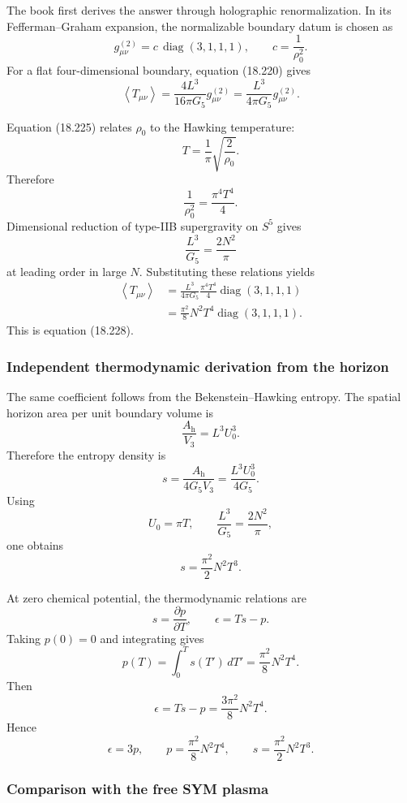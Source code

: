 \documentclass[
  10pt,
  a4paper,
  openany]{book}
\begin{document}
The book first derives the answer through holographic renormalization.
In its Fefferman--Graham expansion, the normalizable boundary datum is
chosen as \[
g^{(2)}_{\mu\nu}
=c\,
\operatorname{diag}(3,1,1,1),
\qquad
c=\frac1{\rho_0^2}.
\] For a flat four-dimensional boundary, equation (18.220) gives \[
\left\langle T_{\mu\nu}\right\rangle
=
\frac{4L^3}{16\pi G_5}
g^{(2)}_{\mu\nu}
=
\frac{L^3}{4\pi G_5}
g^{(2)}_{\mu\nu}.
\]

Equation (18.225) relates \(\rho_0\) to the Hawking temperature: \[
T
=\frac1\pi\sqrt{\frac2{\rho_0}}.
\] Therefore \[
\frac1{\rho_0^2}
=\frac{\pi^4T^4}{4}.
\] Dimensional reduction of type-IIB supergravity on \(S^5\) gives \[
\boxed{
\frac{L^3}{G_5}
=\frac{2N^2}{\pi}
}
\] at leading order in large \(N\). Substituting these relations yields
\[
\begin{aligned}
\left\langle T_{\mu\nu}\right\rangle
&=
\frac{L^3}{4\pi G_5}
\frac{\pi^4T^4}{4}
\operatorname{diag}(3,1,1,1)\\
&=
\frac{\pi^2}{8}N^2T^4
\operatorname{diag}(3,1,1,1).
\end{aligned}
\] This is equation (18.228).

\subsubsection{Independent thermodynamic derivation from the
horizon}\label{independent-thermodynamic-derivation-from-the-horizon}

The same coefficient follows from the Bekenstein--Hawking entropy. The
spatial horizon area per unit boundary volume is \[
\frac{A_{\mathrm h}}{V_3}
=L^3U_0^3.
\] Therefore the entropy density is \[
s
=\frac{A_{\mathrm h}}{4G_5V_3}
=\frac{L^3U_0^3}{4G_5}.
\] Using \[
U_0=\pi T,
\qquad
\frac{L^3}{G_5}=\frac{2N^2}{\pi},
\] one obtains \[
\boxed{
s
=\frac{\pi^2}{2}N^2T^3
}.
\]

At zero chemical potential, the thermodynamic relations are \[
s=\frac{\partial p}{\partial T},
\qquad
\epsilon=Ts-p.
\] Taking \(p(0)=0\) and integrating gives \[
p(T)
=\int_0^T s(T')\,dT'
=\frac{\pi^2}{8}N^2T^4.
\] Then \[
\epsilon
=Ts-p
=\frac{3\pi^2}{8}N^2T^4.
\] Hence \[
\boxed{
\epsilon=3p,
\qquad
p=\frac{\pi^2}{8}N^2T^4,
\qquad
s=\frac{\pi^2}{2}N^2T^3
}.
\]

\subsubsection{Comparison with the free SYM
plasma}\label{comparison-with-the-free-sym-plasma}
\end{document}
